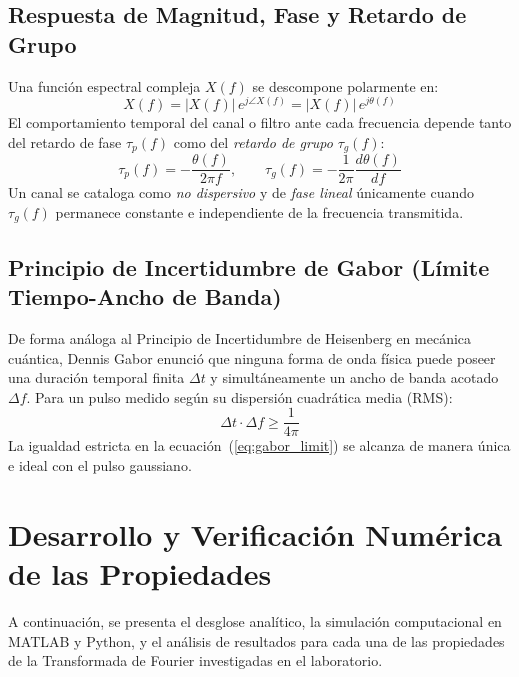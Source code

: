 \documentclass[11pt,a4paper]{article}
\begin{document}
\subsection{Respuesta de Magnitud, Fase y Retardo de Grupo}
Una funci\'on espectral compleja $X(f)$ se descompone polarmente en:
\begin{equation}
  X(f) = |X(f)| \, e^{j \angle X(f)} = |X(f)| \, e^{j \theta(f)}
\end{equation}
El comportamiento temporal del canal o filtro ante cada frecuencia depende tanto del retardo de fase $\tau_p(f)$ como del \textit{retardo de grupo} $\tau_g(f)$:
\begin{equation}
  \tau_p(f) = -\frac{\theta(f)}{2\pi f}, \qquad \tau_g(f) = -\frac{1}{2\pi} \frac{d\theta(f)}{df}
  \label{eq:group_delay}
\end{equation}
Un canal se cataloga como \textit{no dispersivo} y de \textit{fase lineal} \'unicamente cuando $\tau_g(f)$ permanece constante e independiente de la frecuencia transmitida.

\subsection{Principio de Incertidumbre de Gabor (L\'imite Tiempo-Ancho de Banda)}
De forma an\'aloga al Principio de Incertidumbre de Heisenberg en mec\'anica cu\'antica, Dennis Gabor enunci\'o que ninguna forma de onda f\'isica puede poseer una duraci\'on temporal finita $\Delta t$ y simult\'aneamente un ancho de banda acotado $\Delta f$. Para un pulso medido seg\'un su dispersi\'on cuadr\'atica media (RMS):
\begin{equation}
  \Delta t \cdot \Delta f \ge \frac{1}{4\pi}
  \label{eq:gabor_limit}
\end{equation}
La igualdad estricta en la ecuaci\'on~(\ref{eq:gabor_limit}) se alcanza de manera \'unica e ideal con el pulso gaussiano.

\section{Desarrollo y Verificaci\'on Num\'erica de las Propiedades}

A continuaci\'on, se presenta el desglose anal\'itico, la simulaci\'on computacional en MATLAB y Python, y el an\'alisis de resultados para cada una de las propiedades de la Transformada de Fourier investigadas en el laboratorio.
\end{document}
